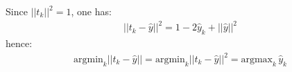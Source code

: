 

Since $||t_k||^2 = 1$, one has:
\begin{eqnarray}
||t_k - \hat{y}||^2 = 1 - 2 \hat{y}_k + ||\hat{y}||^2
\end{eqnarray}
hence:
\begin{eqnarray}
\textrm{argmin}_k ||t_k - \hat{y}|| = \textrm{argmin}_k ||t_k - \hat{y}||^2 = 
\textrm{argmax}_k\, \hat{y}_k
\end{eqnarray}